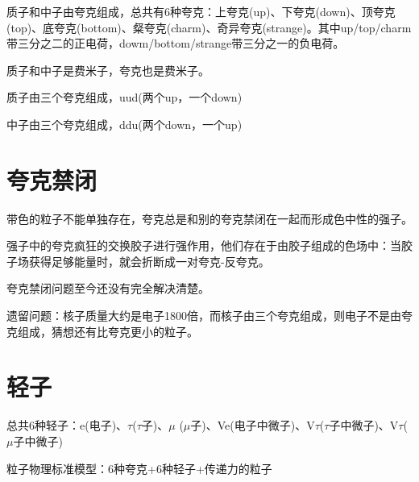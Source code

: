 质子和中子由夸克组成，总共有6种夸克：上夸克(up)、下夸克(down)、顶夸克(top)、底夸克(bottom)、粲夸克(charm)、奇异夸克(strange)。其中up/top/charm带三分之二的正电荷，dowm/bottom/strange带三分之一的负电荷。

质子和中子是费米子，夸克也是费米子。

质子由三个夸克组成，uud(两个up，一个down)

中子由三个夸克组成，ddu(两个down，一个up)

\section{夸克禁闭}

带色的粒子不能单独存在，夸克总是和别的夸克禁闭在一起而形成色中性的强子。

强子中的夸克疯狂的交换胶子进行强作用，他们存在于由胶子组成的色场中：当胶子场获得足够能量时，就会折断成一对夸克-反夸克。

夸克禁闭问题至今还没有完全解决清楚。

遗留问题：核子质量大约是电子1800倍，而核子由三个夸克组成，则电子不是由夸克组成，猜想还有比夸克更小的粒子。

\section{轻子}

总共6种轻子：e(电子)、$\tau$($\tau$子)、$\mu$ ($\mu$子)、Ve(电子中微子)、V$\tau$($\tau$子中微子)、V$\tau$($\mu$子中微子)

粒子物理标准模型：6种夸克+6种轻子+传递力的粒子

\clearpage
